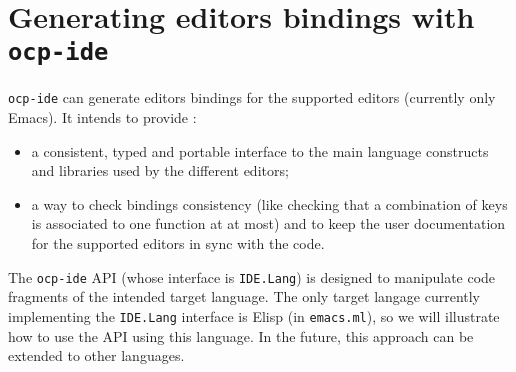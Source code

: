 
\chapter{Generating editors bindings with {\tt ocp-ide}}

{\tt ocp-ide} can generate editors bindings for the supported editors
(currently only Emacs). It intends to provide :

\begin{itemize}
\item a consistent, typed and portable interface to the main language
  constructs and libraries used by the different editors;

\item a way to check bindings consistency (like checking that a
  combination of keys is associated to one function at at most) and to
  keep the user documentation for the supported editors in sync with
  the code.
\end{itemize}

The {\tt ocp-ide} API (whose interface is {\tt IDE.Lang}) is designed
to manipulate code fragments of the intended target language. The only
target langage currently implementing the {\tt IDE.Lang} interface is
Elisp (in {\tt emacs.ml}), so we will illustrate how to use the API
using this language. In the future, this approach can be extended to
other languages.

